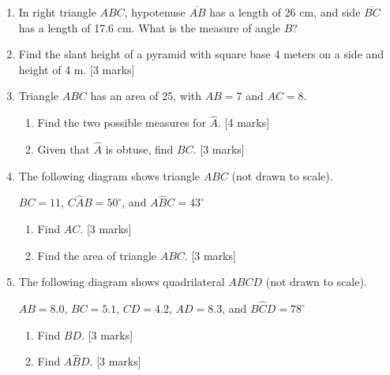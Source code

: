 \documentclass[12pt, twoside]{article}
\begin{document}
\begin{enumerate}
   \item In right triangle $ABC$, hypotenuse $\overline{AB}$ has a length of 26 cm, and side $\overline{BC}$ has a length of 17.6 cm. What is the measure of angle $B$?
   
   \item Find the slant height of a pyramid with square base 4 meters on a side and height of 4 m. \hfill [3 marks]
    
   \item Triangle $ABC$ has an area of 25, with $AB=7$ and $AC=8$. 
   \begin{enumerate}
     \item Find the two possible measures for $\hat{A}$. \hfill [4 marks]
     \item Given that $\hat{A}$ is obtuse, find $BC$. \hfill [3 marks]
   \end{enumerate}

   \newpage

  \item The following diagram shows triangle $ABC$ (not drawn to scale).
  \begin{center}
    \end{center} 
    $BC=11$, $C\hat{A}B=50^\circ$, and $A\hat{B}C=43^\circ$
    \begin{enumerate}
      \item Find $AC$. \hfill [3 marks]
      \item Find the area of triangle $ABC$. \hfill [3 marks]
    \end{enumerate}

    \item The following diagram shows quadrilateral $ABCD$ (not drawn to scale).
  \begin{center}
    \end{center} 
    $AB=8.0$, $BC=5.1$, $CD=4.2$, $AD=8.3$, and $B\hat{C}D=78^\circ$
    \begin{enumerate}
      \item Find $BD$. \hfill [3 marks]
      \item Find $A\hat{B}D$. \hfill [3 marks]
    \end{enumerate}


\end{enumerate}
\end{document}
